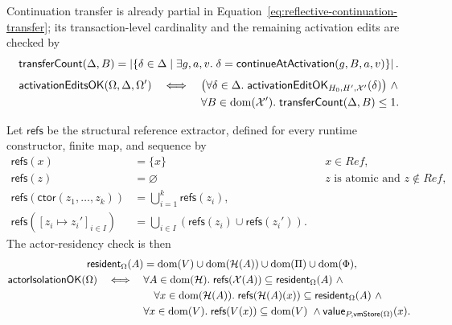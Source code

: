 Continuation transfer is already partial in
Equation~\eqref{eq:reflective-continuation-transfer}; its transaction-level
cardinality and the remaining activation edits are checked by
\begin{equation}\label{eq:continuation-transfer-count}
 \mathsf{transferCount}(\Delta,B)=
 \left|\{\delta\in\Delta\mid\exists g,a,v.\;
       \delta=\mathsf{continueAtActivation}(g,B,a,v)\}\right|.
\end{equation}
\begin{equation}\label{eq:activation-transaction-validity}
\begin{aligned}
 \mathsf{activationEditsOK}(\Omega,\Delta,\Omega')
 \quad\Longleftrightarrow\quad{}
 &\bigl(\forall\delta\in\Delta.\;
   \mathsf{activationEditOK}_{H_0,H',\mathcal X'}(\delta)\bigr)\ \land\\
 &\forall B\in\mathop{\mathrm{dom}}(\mathcal X').\;
   \mathsf{transferCount}(\Delta,B)\le1.
\end{aligned}
\end{equation}

Let $\mathsf{refs}$ be the structural reference extractor, defined for every
runtime constructor, finite map, and sequence by
\begin{equation}\label{eq:structural-reference-extractor}
\begin{aligned}
 \mathsf{refs}(x)&=\{x\}&&x\in\mathit{Ref},\\
 \mathsf{refs}(z)&=\varnothing&&z\text{ is atomic and }z\notin\mathit{Ref},\\
 \mathsf{refs}(\mathsf{ctor}(z_1,\ldots,z_k))
   &=\bigcup_{i=1}^{k}\mathsf{refs}(z_i),\\
 \mathsf{refs}([z_i\mapsto z_i']_{i\in I})
   &=\bigcup_{i\in I}(\mathsf{refs}(z_i)\cup\mathsf{refs}(z_i')).
\end{aligned}
\end{equation}
The actor-residency check is then
\begin{equation}\label{eq:reflective-actor-isolation}
\begin{aligned}
 \mathsf{resident}_{\Omega}(A)
  &=\dom(V)\cup\dom(\mathcal H(A))\cup\dom(\Pi)\cup\dom(\Phi),\\
 \mathsf{actorIsolationOK}(\Omega)\quad\Longleftrightarrow\quad{}
 &\forall A\in\dom(\mathcal H).\;
   \mathsf{refs}(\mathcal X(A))\subseteq\mathsf{resident}_{\Omega}(A)\ \land\\
 &\quad\forall x\in\dom(\mathcal H(A)).\;
   \mathsf{refs}(\mathcal H(A)(x))\subseteq\mathsf{resident}_{\Omega}(A)\ \land\\
 &\forall x\in\dom(V).\;
   \mathsf{refs}(V(x))\subseteq\dom(V)\ \land
   \mathsf{value}_{P,\mathsf{vmStore}(\Omega)}(x).
\end{aligned}
\end{equation}

